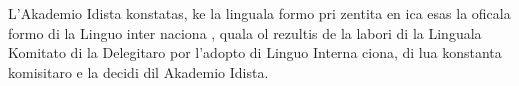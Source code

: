 \begin{VUpage}[8]{}
\VUinterlignePage{13.89pt}
{\renewcommand{\VUsignatureX}{6.77mm}%
 }
\vspace*{29.97mm}

L'Akademio Idista konstatas, ke la linguala formo pri\cc
zentita en ica \nl
{} esas la oficala formo di la Linguo inter\cc
naciona , quala ol rezultis de la labori di la Linguala\nl
Komitato di la Delegitaro por l'adopto di Linguo Interna\cc
ciona, di lua konstanta komisitaro e la decidi dil Akademio\nl
Idista.
\end{VUpage}


